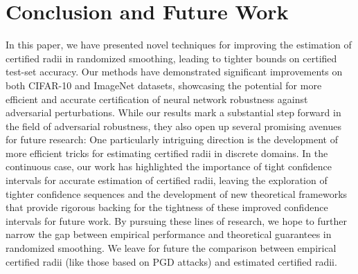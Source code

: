 \section{Conclusion and Future Work}\label{sec:conclusion-and-future-work}
In this paper, we have presented novel techniques for improving the estimation of certified radii in randomized smoothing, leading to tighter bounds on certified test-set accuracy.
Our methods have demonstrated significant improvements on both CIFAR-10 and ImageNet datasets, showcasing the potential for more efficient and accurate certification of neural network robustness against adversarial perturbations.
While our results mark a substantial step forward in the field of adversarial robustness, they also open up several promising avenues for future research:
One particularly intriguing direction is the development of more efficient tricks for estimating certified radii in discrete domains.
In the continuous case, our work has highlighted the importance of tight confidence intervals for accurate estimation of certified radii, leaving the exploration of tighter confidence sequences and the development of new theoretical frameworks that provide rigorous backing for the tightness of these improved confidence intervals for future work.
By pursuing these lines of research, we hope to further narrow the gap between empirical performance and theoretical guarantees in randomized smoothing.
We leave for future the comparison between empirical certified radii (like those based on PGD attacks) and estimated certified radii.
